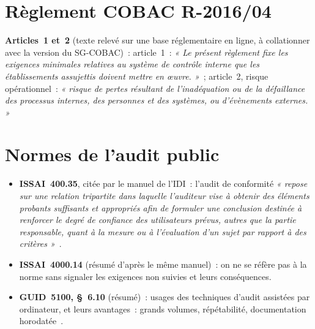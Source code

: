 \section*{Règlement COBAC R-2016/04}

\begin{boxjuris}
\textbf{Articles~1 et~2} (texte relevé sur une base réglementaire en ligne,
à collationner avec la version du SG-COBAC)~: article~1~: \textit{« Le
présent règlement fixe les exigences minimales relatives au système de
contrôle interne que les établissements assujettis doivent mettre en
œuvre. »}~; article~2, risque opérationnel~: \textit{« risque de pertes
résultant de l'inadéquation ou de la défaillance des processus internes, des
personnes et des systèmes, ou d'évènements externes. »}
\end{boxjuris}

\section*{Normes de l'audit public}

\begin{itemize}
    \item \textbf{ISSAI~400.35}, citée par le manuel de l'IDI~: l'audit de
          conformité \textit{« repose sur une relation tripartite dans
          laquelle l'auditeur vise à obtenir des éléments probants suffisants
          et appropriés afin de formuler une conclusion destinée à renforcer
          le degré de confiance des utilisateurs prévus, autres que la partie
          responsable, quant à la mesure ou à l'évaluation d'un sujet par
          rapport à des critères »}~\cite{idi2021conformite}.
    \item \textbf{ISSAI~4000.14} (résumé d'après le même manuel)~: on ne se
          réfère pas à la norme sans signaler les exigences non suivies et
          leurs conséquences.
    \item \textbf{GUID~5100, §~6.10} (résumé)~: usages des techniques
          d'audit assistées par ordinateur, et leurs avantages~: grands
          volumes, répétabilité, documentation horodatée~\cite{intosai2019guid5100}.
\end{itemize}
